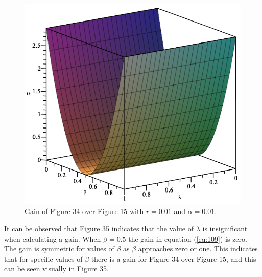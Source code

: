 \documentclass[twocolumn]{article}
\begin{document}
\begin{figure}[h]
\begin{center}
\includegraphics[width=0.65\linewidth]{Phase-Flip-Triple-Channel-r=001-Alpha=001-Gain-Graph.png}
\caption{Gain of Figure 34 over Figure 15 with $r=0.01$ and $\alpha=0.01$.}
\end{center}
\end{figure}
\newline
It can be observed that Figure 35 indicates that the value of $\lambda$ is insignificant when calculating a gain. When $\beta=0.5$ the gain in equation (\ref{eq:109}) is zero. The gain is symmetric for values of $\beta$ as $\beta$ approaches zero or one. This indicates that for specific values of $\beta$ there is a gain for Figure 34 over Figure 15, and this can be seen visually in Figure 35.
\end{document}

